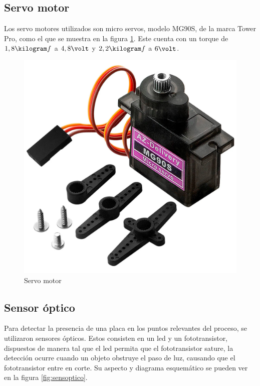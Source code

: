 \documentclass[12pt,letterpaper]{article}     %
\begin{document}
\subsection{Servo motor}

Los servo motores utilizados son micro servos, modelo MG90S, de la marca Tower Pro, como el que
se muestra en la figura \ref{fig:servo}. Este cuenta con un torque de $1,8\kilogram f$ a $4,8\volt$
y $2,2\kilogram f$ a $6\volt$.

\begin{figure}[!ht]
\centering
\includegraphics[scale=0.15]{imagenes/servo.jpg}
\caption{Servo motor}
\label{fig:servo}
\end{figure}

\subsection{Sensor óptico}

Para detectar la presencia de una placa en los puntos relevantes del proceso, se utilizaron sensores ópticos.
Estos consisten en un led y un fototransistor, dispuestos de manera tal que el led permita que el fototransistor
sature, la detección ocurre cuando un objeto obstruye el paso de luz, causando que el fototransistor entre en
corte. Su aspecto y diagrama esquemático se pueden ver en la figura \ref{fig:sensoptico}.
\end{document}
